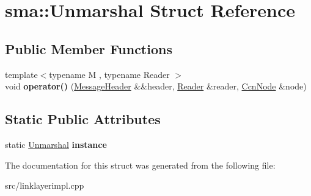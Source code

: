 \hypertarget{structsma_1_1Unmarshal}{\section{sma\-:\-:Unmarshal Struct Reference}
\label{structsma_1_1Unmarshal}
}
\subsection*{Public Member Functions}
\begin{DoxyCompactItemize}
\item 
\hypertarget{structsma_1_1Unmarshal_a71fe0624847263805d97a8eea775c771}{{\footnotesize template$<$typename M , typename Reader $>$ }\\void {\bfseries operator()} (\hyperlink{structsma_1_1MessageHeader}{Message\-Header} \&\&header, \hyperlink{classsma_1_1Reader}{Reader} \&reader, \hyperlink{classsma_1_1CcnNode}{Ccn\-Node} \&node)}\label{structsma_1_1Unmarshal_a71fe0624847263805d97a8eea775c771}

\end{DoxyCompactItemize}
\subsection*{Static Public Attributes}
\begin{DoxyCompactItemize}
\item 
\hypertarget{structsma_1_1Unmarshal_a4963e7c78636413b14f6faa79c72b3c4}{static \hyperlink{structsma_1_1Unmarshal}{Unmarshal} {\bfseries instance}}\label{structsma_1_1Unmarshal_a4963e7c78636413b14f6faa79c72b3c4}

\end{DoxyCompactItemize}


The documentation for this struct was generated from the following file\-:\begin{DoxyCompactItemize}
\item 
src/linklayerimpl.\-cpp\end{DoxyCompactItemize}

